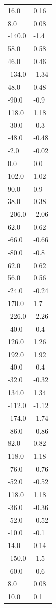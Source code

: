 \begin{longtable}{ll}
16.0 & 0.16 \\
8.0 & 0.08 \\
-140.0 & -1.4 \\
58.0 & 0.58 \\
46.0 & 0.46 \\
-134.0 & -1.34 \\
48.0 & 0.48 \\
-90.0 & -0.9 \\
118.0 & 1.18 \\
-30.0 & -0.3 \\
-48.0 & -0.48 \\
-2.0 & -0.02 \\
0.0 & 0.0 \\
102.0 & 1.02 \\
90.0 & 0.9 \\
38.0 & 0.38 \\
-206.0 & -2.06 \\
62.0 & 0.62 \\
-66.0 & -0.66 \\
-80.0 & -0.8 \\
62.0 & 0.62 \\
56.0 & 0.56 \\
-24.0 & -0.24 \\
170.0 & 1.7 \\
-226.0 & -2.26 \\
-40.0 & -0.4 \\
126.0 & 1.26 \\
192.0 & 1.92 \\
-40.0 & -0.4 \\
-32.0 & -0.32 \\
134.0 & 1.34 \\
-112.0 & -1.12 \\
-174.0 & -1.74 \\
-86.0 & -0.86 \\
82.0 & 0.82 \\
118.0 & 1.18 \\
-76.0 & -0.76 \\
-52.0 & -0.52 \\
118.0 & 1.18 \\
-36.0 & -0.36 \\
-52.0 & -0.52 \\
-10.0 & -0.1 \\
14.0 & 0.14 \\
-150.0 & -1.5 \\
-60.0 & -0.6 \\
8.0 & 0.08 \\
10.0 & 0.1 \\

\end{longtable}
